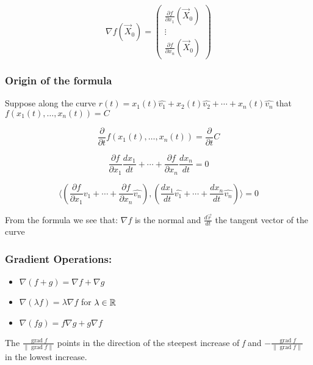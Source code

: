 \[
    \nabla f(\vec{X}_0) = \begin{pmatrix}
    \frac{\partial f}{\partial x_1}(\vec{X}_0) \\
    \vdots \\
    \frac{\partial f}{\partial x_n}(\vec{X}_0)
    \end{pmatrix}
\]

\subsubsection{Origin of the formula}

Suppose along the curve \(r(t) = x_1(t)\hat{v_1} + x_2(t)\hat{v_2} + \cdots + x_n(t)\hat{v_n}\) that 
\(f(x_1(t), \dots, x_n(t)) = C\)

\[
    \frac{\partial}{\partial t}f(x_1(t), \dots, x_n(t)) = \frac{\partial}{\partial t}C
\]

\[
    \frac{\partial f}{\partial x_1}\frac{dx_1}{dt} + \cdots + \frac{\partial f}{\partial x_n}
    \frac{dx_n}{dt} = 0
\]

\[
    \langle \left(\frac{\partial f}{\partial x_1}\hat{v_1} + \cdots + \frac{\partial f}{\partial x_n}
    \hat{v_n}\right) , \left( \frac{dx_1}{dt}\hat{v_1} + \cdots + \frac{dx_n}{dt}\hat{v_n}\right)\rangle = 0
\]

From the formula we see that: \(\nabla f\) is the normal and \(\frac{d\vec{r}}{dt}\) the tangent vector 
of the curve

\QED

\subsubsection{Gradient Operations:}

\begin{itemize}

    \item \( \nabla(f + g) = \nabla f + \nabla g \)

    \item \( \nabla(\lambda f) = \lambda \nabla f \) for \( \lambda \in \mathbb{R} \)

    \item \( \nabla(fg) = f \nabla g + g \nabla f \)

\end{itemize}

The \(\frac{\operatorname{grad}f}{\|\operatorname{grad}f\|}\) points in the direction of the 
steepest increase of \emph{f} and \(- \frac{\operatorname{grad}f}{\|\operatorname{grad}f\|}\) in 
the lowest increase.

